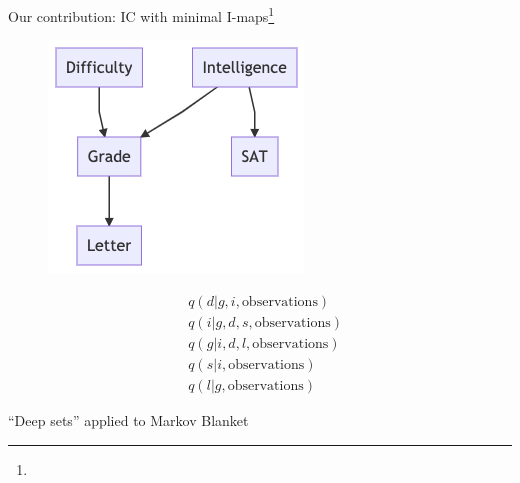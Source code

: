 \begin{frame}[fragile]{Our contribution: IC with minimal I-maps\footnote{}}
    \begin{minipage}{0.4\linewidth}
    \begin{figure}
        \centering
        \includegraphics[width=\linewidth]{Figures/lic/student-network.png}
    \end{figure}
\end{minipage}
\begin{minipage}{0.5\linewidth}
\begin{align*}
    & q(d | g, i, \text{observations}) \\
    & q(i | g, d, s, \text{observations}) \\
    & q(g | i, d, l, \text{observations}) \\
    & q(s | i, \text{observations}) \\
    & q(l | g, \text{observations})
\end{align*}
\end{minipage}

``Deep sets'' \parencite{zaheer2017deep} applied to Markov Blanket


\end{frame}


